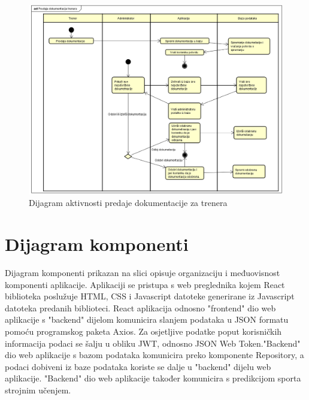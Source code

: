 			\begin{figure}[H]
				\includegraphics[width=\textwidth]{slike/dijagramAktivnosti.png}
				\caption{Dijagram aktivnosti predaje dokumentacije za trenera}
			\end{figure}
%			
%			
			\eject
		\section{Dijagram komponenti}
			Dijagram komponenti prikazan na slici opisuje organizaciju i međuovisnost komponenti aplikacije. Aplikaciji se pristupa s web preglednika kojem React biblioteka poslužuje HTML, CSS i Javascript datoteke generirane iz Javascript datoteka predanih biblioteci. React aplikacija odnosno "frontend" dio web aplikacije s "backend" dijelom komunicira slanjem podataka u JSON formatu pomoću programskog paketa Axios. Za osjetljive podatke poput korisničkih informacija podaci se šalju u obliku JWT, odnosno JSON Web Token."Backend" dio web aplikacije s bazom podataka komunicira preko komponente Repository, a podaci dobiveni iz baze podataka koriste se dalje u "backend" dijelu  web aplikacije. "Backend" dio web aplikacije također komunicira s predikcijom sporta strojnim učenjem.
			

